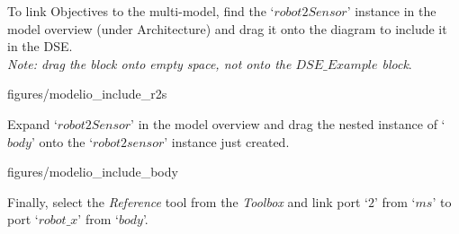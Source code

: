 \documentclass[11pt,a4paper]{../tutorial}
\begin{document}
\begin{instructions}
\newpage

\item To link Objectives to the multi-model, find the `$robot2Sensor$' instance in the model overview (under Architecture) and drag it onto the diagram to include it in the DSE. \\ \textit{Note: drag the block onto empty space, not onto the $DSE\_Example$ block}.

\begin{center}
\begin{annotation}[width=0.7\linewidth]{figures/modelio_include_r2s}
    \end{annotation}
\end{center}

\item Expand `$robot2Sensor$' in the model overview and drag the nested instance of `$body$' onto the `$robot2sensor$' instance just created.

\begin{center}
\begin{annotation}[width=0.8\linewidth]{figures/modelio_include_body}
    \end{annotation}
\end{center}

\newpage

%

\item \label{obj_link} Finally, select the \emph{Reference} tool from the \emph{Toolbox} and link port `$2$' from `$ms$' to port `$robot\_x$' from `$body$'.


\end{instructions}
\end{document}

